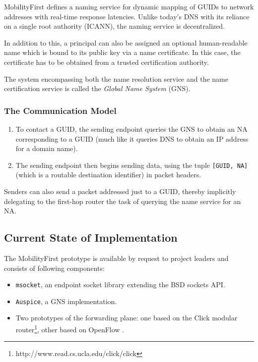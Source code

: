                 MobilityFirst defines a naming service for dynamic mapping of GUIDs to network addresses with real-time response latencies. Unlike today's DNS with its reliance on a single root authority (ICANN), the naming service is decentralized.

                In addition to this, a principal can also be assigned an optional human-readable name which is bound to its public key via a name certificate. In this case, the certificate has to be obtained from a trusted certification authority.

                The system encompassing both the name resolution service and the name certification service is called the \emph{Global Name System} (GNS).

            \subsubsection{The Communication Model}

                \begin{enumerate}
                    \item To contact a GUID, the sending endpoint queries the GNS to obtain an NA corresponding to a GUID (much like it queries DNS to obtain an IP address for a domain name).
                    \item The sending endpoint then begins sending data, using the tuple \texttt{[GUID, NA]} (which is a routable destination identifier) in packet headers.
                \end{enumerate}

                Senders can also send a packet addressed just to a GUID, thereby implicitly delegating to the first-hop router the task of querying the name service for an NA.

        \subsection{Current State of Implementation}

            The MobilityFirst prototype is available by request to project leaders and consists of following components:

            \begin{itemize}
                \item \texttt{msocket}, an endpoint socket library extending the BSD sockets API.
                \item \texttt{Auspice}, a GNS implementation.
                \item Two prototypes of the forwarding plane: one based on the Click modular router\footnote{http://www.read.cs.ucla.edu/click/click}, other based on OpenFlow \cite{openflow}.
            \end{itemize}


